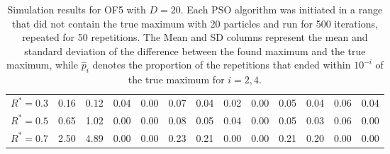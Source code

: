\documentclass[12pt]{article}
\begin{document}
\begin{table}[ht]
{\begin{tabular}{r|rrrr|rrrr|rrrr}
  $R^* = 0.3$ & 0.16 & 0.12 & 0.04 & 0.00 & 0.07 & 0.04 & 0.02 & 0.00 & 0.05 & 0.04 & 0.06 & 0.04 \\ 
  $R^* = 0.5$ & 0.65 & 1.02 & 0.00 & 0.00 & 0.08 & 0.05 & 0.04 & 0.00 & 0.05 & 0.03 & 0.06 & 0.00 \\ 
  $R^* = 0.7$ & 2.50 & 4.89 & 0.00 & 0.00 & 0.23 & 0.21 & 0.00 & 0.00 & 0.21 & 0.20 & 0.00 & 0.00 \\ 
   \hline
\end{tabular}
}
\caption{Simulation results for OF5 with $D=20$. Each PSO algorithm was initiated in a range that did not contain the true maximum with 20 particles and run for 500 iterations, repeated for 50 repetitions. The Mean and SD columns represent the mean and standard deviation of the difference between the found maximum and the true maximum, while $\widehat{p}_i$ denotes the proportion of the repetitions that ended within $10^{-i}$ of the true maximum for $i=2,4$.}
\label{tab:psosim5}
\end{table}
\end{document}
